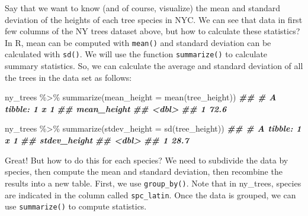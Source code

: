 \documentclass[
]{krantz}
\newenvironment{Shaded}{\begin{snugshade}}{\end{snugshade}}
\newcommand{\AttributeTok}[1]{\textcolor[rgb]{0.77,0.63,0.00}{#1}}
\newcommand{\DocumentationTok}[1]{\textcolor[rgb]{0.56,0.35,0.01}{\textbf{\textit{#1}}}}
\newcommand{\FunctionTok}[1]{\textcolor[rgb]{0.00,0.00,0.00}{#1}}
\newcommand{\NormalTok}[1]{#1}
\newcommand{\SpecialCharTok}[1]{\textcolor[rgb]{0.00,0.00,0.00}{#1}}
\begin{document}
Say that we want to know (and of course, visualize) the mean and standard deviation of the heights of each tree species in NYC. We can see that data in first few columns of the NY trees dataset above, but how to calculate these statistics? In R, mean can be computed with \texttt{mean()} and standard deviation can be calculated with \texttt{sd()}. We will use the function \texttt{summarize()} to calculate summary statistics. So, we can calculate the average and standard deviation of all the trees in the data set as follows:

\begin{Shaded}
\begin{Highlighting}[]
\NormalTok{ny\_trees }\SpecialCharTok{\%\textgreater{}\%}
  \FunctionTok{summarize}\NormalTok{(}\AttributeTok{mean\_height =} \FunctionTok{mean}\NormalTok{(tree\_height))}
\DocumentationTok{\#\# \# A tibble: 1 x 1}
\DocumentationTok{\#\#   mean\_height}
\DocumentationTok{\#\#         \textless{}dbl\textgreater{}}
\DocumentationTok{\#\# 1        72.6}

\NormalTok{ny\_trees }\SpecialCharTok{\%\textgreater{}\%}
  \FunctionTok{summarize}\NormalTok{(}\AttributeTok{stdev\_height =} \FunctionTok{sd}\NormalTok{(tree\_height))}
\DocumentationTok{\#\# \# A tibble: 1 x 1}
\DocumentationTok{\#\#   stdev\_height}
\DocumentationTok{\#\#          \textless{}dbl\textgreater{}}
\DocumentationTok{\#\# 1         28.7}
\end{Highlighting}
\end{Shaded}

Great! But how to do this for each species? We need to subdivide the data by species, then compute the mean and standard deviation, then recombine the results into a new table. First, we use \texttt{group\_by()}. Note that in ny\_trees, species are indicated in the column called \texttt{spc\_latin}. Once the data is grouped, we can use \texttt{summarize()} to compute statistics.
\end{document}
